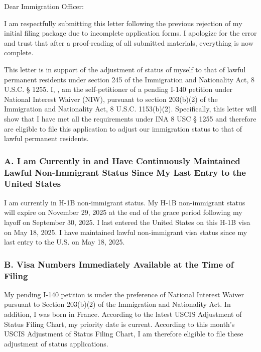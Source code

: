 \setcounter{page}{1}
\pagestyle{fancy}
\fancyhf{}
\rhead{\myFirstName {} \myLastName}


\myAddress

\USCISaddress


Dear Immigration Officer:

I am respectfully submitting this letter following the previous rejection of my initial filing package due to incomplete application forms.
I apologize for the error and trust that after a proof-reading of all submitted materials, everything is now complete. 

This letter is in support of the adjustment of status of myself to that of lawful permanent residents under section 245 of the Immigration and Nationality Act, 8 U.S.C. § 1255. I, \myFirstName {} \myLastName, am the self-petitioner of a pending I-140 petition under National Interest Waiver (NIW), pursuant to section 203(b)(2) of the Immigration and Nationality Act, 8 U.S.C. 1153(b)(2). Specifically, this letter will show that I have met all the requirements under INA 8 USC § 1255 and therefore are eligible to file this application to adjust our immigration status to that of lawful permanent residents.

\subsubsection*{A. I am Currently in and Have Continuously Maintained Lawful Non-Immigrant Status Since My Last Entry to the United States}

I am currently in H-1B non-immigrant status. My H-1B non-immigrant status will expire on November 29, 2025 at the end of the grace period following my layoff on September 30, 2025. I last entered the United States on this H-1B visa on May 18, 2025. I have maintained lawful non-immigrant visa status since my last entry to the U.S. on May 18, 2025.

\subsubsection*{B. Visa Numbers Immediately Available at the Time of Filing}

My pending I-140 petition is under the preference of National Interest Waiver pursuant to Section 203(b)(2) of the Immigration and Nationality Act.  In addition, I was born in France. According to the latest USCIS Adjustment of Status Filing Chart, my priority date is current. According to this month’s USCIS Adjustment of Status Filing Chart, I am therefore eligible to file these adjustment of status applications.

